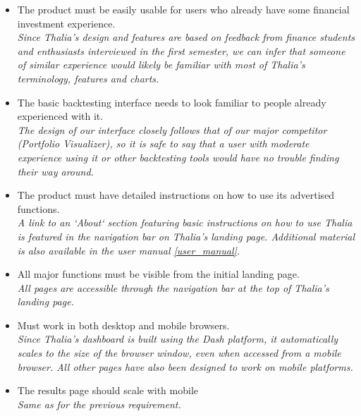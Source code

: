 \documentclass[main.tex]{subfiles}
\begin{document}
\begin{itemize}

    \item The product must be easily usable for users who already have some ﬁnancial investment experience.\\
    \textit{Since Thalia’s design and features are based on feedback from finance students and enthusiasts interviewed in the first semester, we can infer that someone of similar experience would likely be familiar with most of Thalia's terminology, features and charts.}
    \item The basic backtesting interface needs to look familiar to people already experienced with it. \\
    \textit{The design of our interface closely follows that of our major competitor (Portfolio Visualizer), so it is safe to say that a user with moderate experience using it or other backtesting tools would have no trouble finding their way around.}
    
    \item The product must have detailed instructions on how to use its advertised functions.\\
    \textit{A link to an `About` section featuring basic instructions on how to use Thalia is featured in the navigation bar on Thalia’s landing page. Additional material is also available in the user manual \ref{user_manual}.}
    \item All major functions must be visible from the initial landing page.\\
    \textit{All pages are accessible through the navigation bar at the top of Thalia’s landing page.}
    \item Must work in both desktop and mobile browsers.\\
    \textit{Since Thalia’s dashboard is built using the Dash platform, it automatically scales to the size of the browser window, even when accessed from a mobile browser. All other pages have also been designed to work on mobile platforms.}
    \item The results page should scale with mobile\\
    \textit{Same as for the previous requirement.}

\end{itemize}
\end{document}
